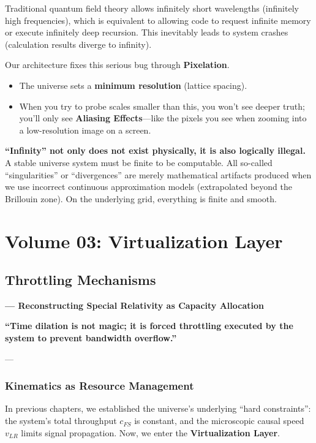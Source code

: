 \documentclass[11pt,a4paper,twoside]{book}
\begin{document}
Traditional quantum field theory allows infinitely short wavelengths (infinitely high frequencies), which is equivalent to allowing code to request infinite memory or execute infinitely deep recursion. This inevitably leads to system crashes (calculation results diverge to infinity).

Our architecture fixes this serious bug through \textbf{Pixelation}.

\begin{itemize}
\item The universe sets a \textbf{minimum resolution} (lattice spacing).

\item When you try to probe scales smaller than this, you won't see deeper truth; you'll only see \textbf{Aliasing Effects}---like the pixels you see when zooming into a low-resolution image on a screen.
\end{itemize}

\textbf{``Infinity'' not only does not exist physically, it is also logically illegal.} A stable universe system must be finite to be computable. All so-called ``singularities'' or ``divergences'' are merely mathematical artifacts produced when we use incorrect continuous approximation models (extrapolated beyond the Brillouin zone). On the underlying grid, everything is finite and smooth.

 
\part{Volume 03: Virtualization Layer}

\chapter{Throttling Mechanisms}

\textbf{--- Reconstructing Special Relativity as Capacity Allocation}

\textbf{``Time dilation is not magic; it is forced throttling executed by the system to prevent bandwidth overflow.''}

---

\section{Kinematics as Resource Management}

In previous chapters, we established the universe's underlying ``hard constraints'': the system's total throughput \textbf{$c_{FS}$} is constant, and the microscopic causal speed \textbf{$v_{LR}$} limits signal propagation. Now, we enter the \textbf{Virtualization Layer}.
\end{document}
